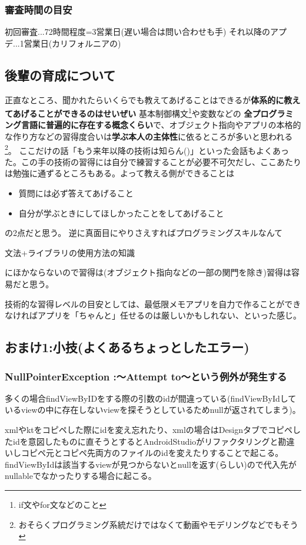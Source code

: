 \documentclass[a4paper]{ltjsreport}
\begin{document}
\subsubsection{審査時間の目安}
初回審査...72時間程度=3営業日(遅い場合は問い合わせも手)
それ以降のアプデ...1営業日(カリフォルニアの)
\subsection{後輩の育成について}
正直なところ、聞かれたらいくらでも教えてあげることはできるが\textbf{\gtfamily 体系的に教えてあげることができるのはせいぜい} 基本制御構文\footnote{if文やfor文などのこと}や変数などの
\textbf{\gtfamily 全プログラミング言語に普遍的に存在する概念くらい}で、オブジェクト指向やアプリの本格的な作り方などの習得度合いは\textbf{\gtfamily 学ぶ本人の主体性}に依るところが多いと思われる\footnote{おそらくプログラミング系統だけではなくて動画やモデリングなどでもそう}。
ここだけの話「もう来年以降の技術は知らん()」といった会話もよくあった。この手の技術の習得には自分で練習することが必要不可欠だし、ここあたりは勉強に通ずるところもある。よって教える側ができることは
\begin{itemize}
  \item 質問には必ず答えてあげること
  \item 自分が学ぶときにしてほしかったことをしてあげること
\end{itemize}
の2点だと思う。
逆に真面目にやりさえすればプログラミングスキルなんて\par
文法+ライブラリの使用方法の知識\par
にほかならないので習得は(オブジェクト指向などの一部の関門を除き)習得は容易だと思う。\par
技術的な習得レベルの目安としては、最低限メモアプリを自力で作ることができなければアプリを「ちゃんと」任せるのは厳しいかもしれない、といった感じ。
\subsection{おまけ1:小技(よくあるちょっとしたエラー)}
\subsubsection{NullPointerException :～Attempt to～という例外が発生する}
多くの場合findViewByIDをする際の引数のidが間違っている(findViewByIdしているviewの中に存在しないviewを探そうとしているためnullが返されてしまう)。\par
xmlやktをコピペした際にidを変え忘れたり、xmlの場合はDesignタブでコピペしたidを意図したものに直そうとするとAndroidStudioがリファクタリングと勘違いしコピペ元とコピペ先両方のファイルのidを変えたりすることで起こる。findViewByIdは該当するviewが見つからないとnullを返す(らしい)ので代入先がnullableでなかったりする場合に起こる。
\end{document}
